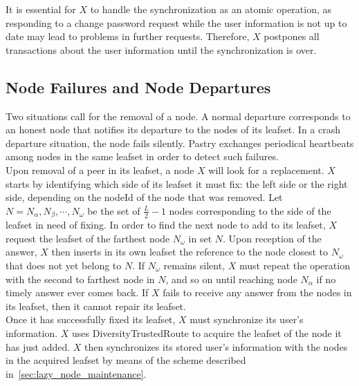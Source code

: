 
It is essential for $X$ to handle the synchronization as an atomic operation,
as responding to a change password request while the user information is not up
to date may lead to problems in further requests. Therefore, $X$ postpones all
transactions about the user information until the synchronization is over.


\subsection{Node Failures and Node Departures}
\label{sec:node_failures_and_departures}
Two situations call for the removal of a node. A normal departure corresponds
to an honest node that notifies its departure to the nodes of its leafset. In a
crash departure situation, the node fails silently. Pastry exchanges
periodical heartbeats among nodes in the same leafset in order to detect such
failures.\\

Upon removal of a peer in its leafset, a node $X$ will look for a replacement.
$X$ starts by identifying which side of its leafset it must fix: the left side
or the right side, depending on the nodeId of the node that was removed. Let $N
= {N_{\alpha}, N_{\beta}, \cdots, N_{\omega}}$ be the set of $\frac{L}{2} - 1$
nodes corresponding to the side of the leafset in need of fixing. In order to
find the next node to add to its leafset, $X$ request the leafset of the
farthest node $N_{\omega}$ in set $N$. Upon reception of the answer, $X$ then
inserts in its own leafset the reference to the node closest to $N_{\omega}$
that does not yet belong to $N$. If $N_{\omega}$ remains silent, $X$ must
repeat the operation with the second to farthest node in $N$, and so on until
reaching node $N_{\alpha}$ if no timely answer ever comes back. If $X$ fails to
receive any answer from the nodes in its leafset, then it cannot repair its
leafset.\\

Once it has successfully fixed its leafset, $X$ must synchronize its user's
information. $X$
uses DiversityTrustedRoute to acquire the leafset of the node it has just
added. $X$ then synchronizes its stored user's information with the nodes in
the acquired leafset by means of the scheme described in~\ref{sec:lazy_node_maintenance}.


